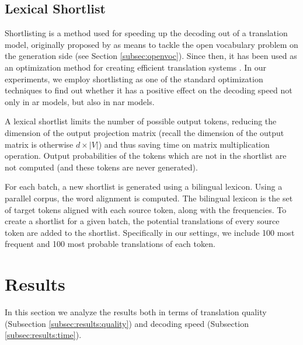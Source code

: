 \subsection{Lexical Shortlist}
\label{subsec:exp:shortlist}

Shortlisting is a method used for speeding up the decoding out of a translation
model, originally proposed by \citet{jean-etal-2015-using} as means to tackle
the open vocabulary problem on the generation side (see Section
\ref{subsec:openvoc}). Since then, it has been used as an optimization method
for creating efficient translation systems \citep{kim-etal-2019-research,
  bogoychev-etal-2020-edinburghs}.  In our experiments, we employ shortlisting
as one of the standard optimization techniques to find out whether it has a
positive effect on the decoding speed not only in \ac{ar} models, but also in
\ac{nar} models.

A lexical shortlist limits the number of possible output tokens, reducing the
dimension of the output projection matrix (recall the dimension of the output
matrix is otherwise $d \times |V|$) and thus saving time on matrix
multiplication operation. Output probabilities of the tokens which are not in
the shortlist are not computed (and these tokens are never generated).

For each batch, a new shortlist is generated using a bilingual lexicon.  Using
a parallel corpus, the word alignment is computed. The bilingual lexicon is the
set of target tokens aligned with each source token, along with the
frequencies. To create a shortlist for a given batch, the potential
translations of every source token are added to the shortlist. Specifically in
our settings, we include 100 most frequent and 100 most probable translations
of each token.

\section{Results}%
\label{sec:exp:results}

In this section we analyze the results both in terms of translation quality
(Subsection \ref{subsec:results:quality}) and decoding speed (Subsection
\ref{subsec:results:time}).


